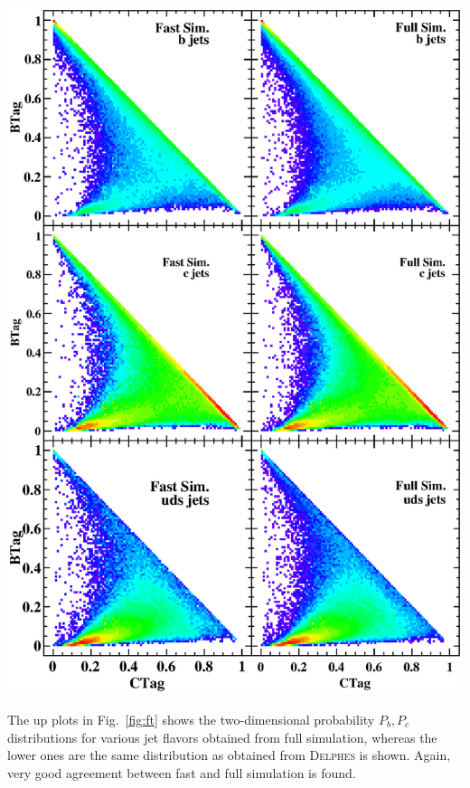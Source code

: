 \documentclass[a4paper,10pt,twoside]{cpc-hepnp}
\begin{document}
\begin{multicols}{2}
\begin{center}
\includegraphics[width=0.98\linewidth]{figs/flavor-tagging}
\end{center}

The up plots in Fig.~\ref{fig:ft} shows the two-dimensional probability $P_b, P_c$ distributions for various jet flavors obtained from full simulation, 
whereas the lower ones are the same distribution as obtained from {\textsc{Delphes}} is shown. 
Again, very good agreement between fast and full simulation is found.


\end{multicols}
\end{document}
